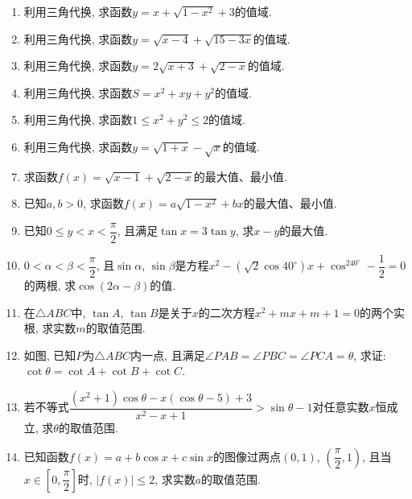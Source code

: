 \documentclass[10pt,a4paper]{article}
\begin{document}
\begin{enumerate}[1.]
\begin{center}
\end{center}
\item 利用三角代换, 求函数$y=x+\sqrt {1-x^2}+3$的值域.
\item 利用三角代换, 求函数$y=\sqrt {x-4}+\sqrt {15-3x}$的值域.
\item 利用三角代换, 求函数$y=2\sqrt {x+3}+\sqrt {2-x}$的值域.
\item 利用三角代换, 求函数$S=x^2+xy+y^2$的值域.
\item 利用三角代换, 求函数$1\le x^2+y^2\le 2$的值域.
\item 利用三角代换, 求函数$y=\sqrt {1+x}-\sqrt x$的值域.
\item 求函数$f(x)=\sqrt {x-1}+\sqrt {2-x}$的最大值、最小值.
\item 已知$a,b>0$, 求函数$f(x)=a\sqrt {1-x^2}+bx$的最大值、最小值.
\item 已知$0\le y<x<\dfrac{\pi}2$, 且满足$\tan x=3\tan y$, 求$x-y$的最大值.
\item $0<\alpha <\beta <\dfrac{\pi}2$, 且$\sin \alpha$, $\sin \beta$是方程$x^2-(\sqrt 2\cos 40^\circ)x+\cos ^240^\circ -\dfrac 12=0$的两根, 求$\cos (2\alpha -\beta)$的值.
\item 在$\triangle ABC$中, $\tan A$, $\tan B$是关于$x$的二次方程$x^2+mx+m+1=0$的两个实根, 求实数$m$的取值范围.
\item 如图, 已知$P$为$\triangle ABC$内一点, 且满足$\angle PAB=\angle PBC=\angle PCA=\theta$, 求证: $\cot \theta =\cot A+\cot B+\cot C$.
\begin{center}
\end{center}
\item 若不等式$\dfrac{(x^2+1)\cos \theta -x(\cos \theta -5)+3}{x^2-x+1}>\sin \theta -1$对任意实数$x$恒成立, 求$\theta$的取值范围.
\item 已知函数$f(x)=a+b\cos x+c\sin x$的图像过两点$(0, 1)$, $(\dfrac{\pi}2,1)$, 且当$x\in [0,\dfrac{\pi}2]$时, $|f(x)|\le 2$, 求实数$a$的取值范围.

\end{enumerate}
\end{document}
